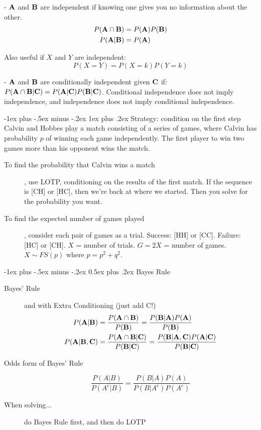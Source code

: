 \documentclass[10pt,landscape]{article}
\makeatletter
\theoremstyle{definition}
\renewcommand{\section}{\@startsection{section}{1}{0mm}%
                                {-1ex plus -.5ex minus -.2ex}%
                                {0.5ex plus .2ex}%
                                {\normalfont\large\bfseries}}
\renewcommand{\subsubsection}{\@startsection{subsubsection}{3}{0mm}%
                                {-1ex plus -.5ex minus -.2ex}%
                                {1ex plus .2ex}%
                                {\normalfont\small\bfseries}}
\makeatother
\begin{document}
\begin{multicols}{3}
\begin{description}
        \item[Independent Events] - ${\bf A}$ and ${\bf B}$ are independent if knowing one gives you no information about the other.
           \begin{align*} 
            P({\bf A}\cap {\bf B}) &= P({\bf A})P({\bf B}) \\
            P({\bf A}|{\bf B}) &= P({\bf A})
           \end{align*}
        \item Also useful if $X$ and $Y$ are independent:
        \[P(X=Y)=P(X=k)P(Y=k)\]
        \item[Conditional Independence] - ${\bf A}$ and ${\bf B}$ are conditionally independent given ${\bf C}$ if: $P({\bf A}\cap {\bf B}|{\bf C}) = P({\bf A}|{\bf C})P({\bf B}|{\bf C})$. Conditional independence does not imply independence, and independence does not imply conditional independence.
    \end{description}

\subsubsection{Strategy: condition on the first step}
Calvin and Hobbes play a match consisting of a series of games, where Calvin has probability $p$ of winning each game independently. The first player to win two games more than his opponent wins the match. 

\begin{description}
\item[To find the probability that Calvin wins a match], use LOTP, conditioning on the results of the first match. If the sequence is [CH] or [HC], then we're back at where we started. Then you solve for the probability you want. 
\item[To find the expected number of games played], consider each pair of games as a trial. Success: [HH] or [CC]. Failure: [HC] or [CH]. $X$ = number of trials. $G = 2X$ = number of games. $X \sim FS(p)$ where $p=p^2+q^2$.
\end{description}
\section{Bayes Rule}

\begin{description}
\item[Bayes' Rule] and with Extra Conditioning (just add C!)
    \begin{align*}
         P({\bf A}|{\bf B}) &= \frac{P({\bf A} \cap {\bf B})}{P({\bf B})} = \frac{P({\bf B}|{\bf A})P({\bf A})}{P({\bf B})} \\
         P({\bf A}|{\bf B}, {\bf C}) &= \frac{P({\bf A} \cap {\bf B} | {\bf C})}{P({\bf B} | {\bf C})} = \frac{P({\bf B}|{\bf A}, {\bf C})P({\bf A} | {\bf C})}{P({\bf B} | {\bf C})} 
    \end{align*}
\item[Odds form of Bayes' Rule]
\[\frac{P(A|B)}{P(A^c|B)}=\frac{P(B|A)P(A)}{P(B|A^c)P(A^c)}\]
    \item[When solving...] do Bayes Rule first, and then do LOTP
\end{description}


\end{multicols}
\end{document}

